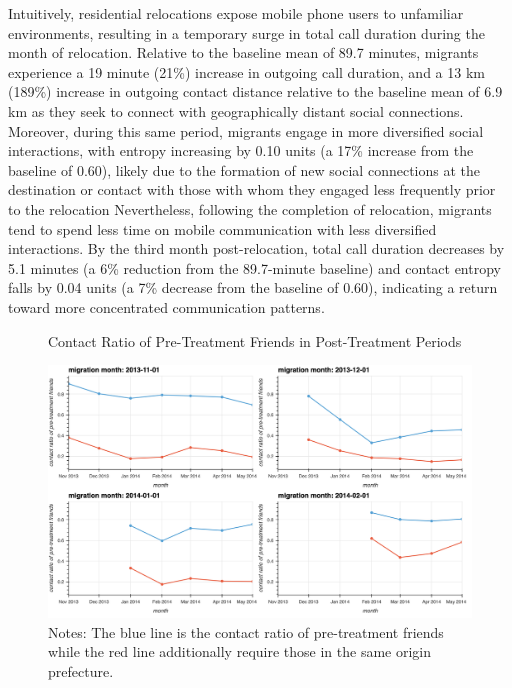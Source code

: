 Intuitively, residential relocations expose mobile phone users to unfamiliar environments, resulting in a temporary surge in total call duration during the month of relocation.
Relative to the baseline mean of 89.7 minutes, migrants experience a 19 minute (21\%) increase in outgoing call duration, and a 13 km (189\%) increase in outgoing contact distance relative to the baseline mean of 6.9 km as they seek to connect with geographically distant social connections.
Moreover, during this same period, migrants engage in more diversified social interactions, with entropy increasing by 0.10 units (a 17\% increase from the baseline of 0.60), likely due to the formation of new social connections at the destination or contact with those with whom they engaged less frequently prior to the relocation
Nevertheless, following the completion of relocation, migrants tend to spend less time on mobile communication with less diversified interactions. By the third month post-relocation, total call duration decreases by 5.1 minutes (a 6\% reduction from the 89.7-minute baseline) and contact entropy falls by 0.04 units (a 7\% decrease from the baseline of 0.60), indicating a return toward more concentrated communication patterns.


\begin{figure}[h!]
\centering
\caption{Contact Ratio of Pre-Treatment Friends in Post-Treatment Periods}

\includegraphics[scale=0.35]{figures/contact_ratio_of_pretreatment_friends.png}

\caption*{Notes: The blue line is the contact ratio of pre-treatment friends while the red line additionally require those in the same origin prefecture.}
\label{fig:contact_ratio_old_friends}
\end{figure}


